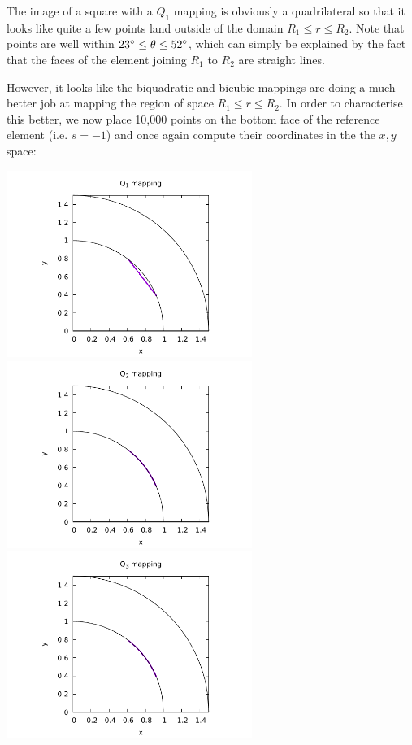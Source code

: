 The image of a square with a $Q_1$ mapping is obviously a quadrilateral
so that it looks like quite a few points land outside of the domain $R_1\leq r\leq R_2$.
Note that points are well within $23\degree \leq \theta \leq 52\degree$, which can 
simply be explained by the fact that the faces of the element joining $R_1$
to $R_2$ are straight lines.

However, it looks like the biquadratic and bicubic mappings are doing a much better 
job at mapping the region of space $R_1\leq r\leq R_2$. In order to characterise 
this better, we now place 10,000 points on the bottom face of 
the reference element (i.e. $s=-1$)
and once again compute their coordinates in the the $x,y$ space:

\begin{center}
\includegraphics[width=8cm]{images/mappings/curved/xy1_line.pdf}
\includegraphics[width=8cm]{images/mappings/curved/xy2_line.pdf}\\
\includegraphics[width=8cm]{images/mappings/curved/xy3_line.pdf}

\end{center}
